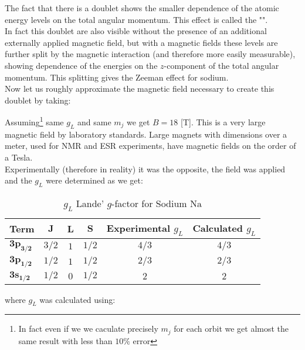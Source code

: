 	\begin{tcolorbox}[colframe=black,colback=white,sharp corners]
	The fact that there is a doublet shows the smaller dependence of the atomic energy levels on the total angular momentum. This effect is called the "".\\
	
	In fact this doublet are also visible without the presence of an additional externally applied magnetic field, but with a magnetic fields these levels are further split by the magnetic interaction (and therefore more easily measurable), showing dependence of the energies on the $z$-component of the total angular momentum. This splitting gives the Zeeman effect for sodium.\\
	
	Now let us roughly approximate the magnetic field necessary to create this doublet by taking:
	
	Assuming\footnote{In fact even if we we caculate precisely $m_j$ for each orbit we get almost the same result with less than $10\%$ error} same $g_L$ and same $m_j$ we get $B=18$ [T]. This is a very large magnetic field by laboratory standards. Large magnets with dimensions over a meter, used for NMR and ESR experiments, have magnetic fields on the order of a Tesla.\\

	Experimentally (therefore in reality) it was the opposite, the field was applied and the $g_L$ were determined as we get:
	\begin{table}[H]
		\centering
		\begin{tabular}{|l|c|c|c|c|c|}
		\hline
		\rowcolor[HTML]{9B9B9B} 
		\textbf{Term} & \textbf{$\pmb{J}$} & \textbf{$\pmb{L}$} & \textbf{$\pmb{S}$} & Experimental \textbf{$g_L$} & Calculated \textbf{$g_L$}\\ \hline
		\cellcolor[HTML]{9B9B9B}\textbf{$\pmb{3p_{3/2}}$} & $3/2$ & $1$ & $1/2$ & $4/3$ & $4/3$ \\ \hline
		\cellcolor[HTML]{9B9B9B}\textbf{$\pmb{3p_{1/2}}$} & $1/2$ & $1$ & $1/2$ & $2/3$ & $2/3$\\ \hline
		\cellcolor[HTML]{9B9B9B}\textbf{$\pmb{3s_{1/2}}$} & $1/2$ & $0$ & $1/2$ & $2$ & $2$ \\ \hline
		\end{tabular}
		\caption{$g_L$ Lande' $g$-factor for Sodium $\mathrm{Na}$}
	\end{table}
	where $g_L$ was calculated using:
	
	\end{tcolorbox}
	
